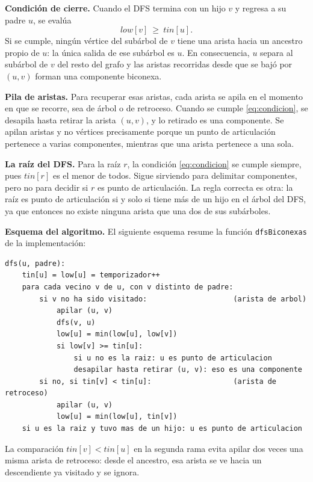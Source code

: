 \documentclass[11pt,a4paper]{article}
\numberwithin{equation}{section}
\newcommand{\tin}{\mathit{tin}}
\newcommand{\low}{\mathit{low}}
\begin{document}
\textbf{Condición de cierre.} Cuando el DFS termina con un hijo $v$ y regresa a su padre $u$, se evalúa
\begin{equation}
\low[v]\ \ge\ \tin[u].
\label{eq:condicion}
\end{equation}
Si se cumple, ningún vértice del subárbol de $v$ tiene una arista hacia un ancestro propio de $u$: la única salida de ese subárbol es $u$. En consecuencia, $u$ separa al subárbol de $v$ del resto del grafo y las aristas recorridas desde que se bajó por $(u,v)$ forman una componente biconexa.

\textbf{Pila de aristas.} Para recuperar esas aristas, cada arista se apila en el momento en que se recorre, sea de árbol o de retroceso. Cuando se cumple \eqref{eq:condicion}, se desapila hasta retirar la arista $(u,v)$, y lo retirado es una componente. Se apilan aristas y no vértices precisamente porque un punto de articulación pertenece a varias componentes, mientras que una arista pertenece a una sola.

\textbf{La raíz del DFS.} Para la raíz $r$, la condición \eqref{eq:condicion} se cumple siempre, pues $\tin[r]$ es el menor de todos. Sigue sirviendo para delimitar componentes, pero no para decidir si $r$ es punto de articulación. La regla correcta es otra: la raíz es punto de articulación si y solo si tiene más de un hijo en el árbol del DFS, ya que entonces no existe ninguna arista que una dos de sus subárboles.

\textbf{Esquema del algoritmo.} El siguiente esquema resume la función \texttt{dfsBiconexas} de la implementación:

{\small
\begin{verbatim}
dfs(u, padre):
    tin[u] = low[u] = temporizador++
    para cada vecino v de u, con v distinto de padre:
        si v no ha sido visitado:                    (arista de arbol)
            apilar (u, v)
            dfs(v, u)
            low[u] = min(low[u], low[v])
            si low[v] >= tin[u]:
                si u no es la raiz: u es punto de articulacion
                desapilar hasta retirar (u, v): eso es una componente
        si no, si tin[v] < tin[u]:                   (arista de retroceso)
            apilar (u, v)
            low[u] = min(low[u], tin[v])
    si u es la raiz y tuvo mas de un hijo: u es punto de articulacion
\end{verbatim}
}

La comparación $\tin[v]<\tin[u]$ en la segunda rama evita apilar dos veces una misma arista de retroceso: desde el ancestro, esa arista se ve hacia un descendiente ya visitado y se ignora.
\end{document}
